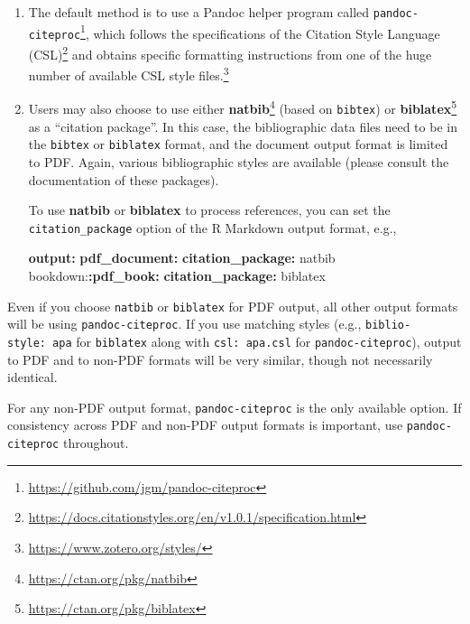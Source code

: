 \documentclass[
  12pt,
]{krantz}
\newenvironment{Shaded}{\begin{snugshade}}{\end{snugshade}}
\newcommand{\AttributeTok}[1]{\textcolor[rgb]{0.13,0.29,0.53}{#1}}
\newcommand{\FunctionTok}[1]{\textcolor[rgb]{0.13,0.29,0.53}{\textbf{#1}}}
\newcommand{\KeywordTok}[1]{\textcolor[rgb]{0.13,0.29,0.53}{\textbf{#1}}}
\renewcommand{\href}[2]{#2\footnote{\url{#1}}}
\theoremstyle{definition}
\theoremstyle{definition}
\theoremstyle{definition}
\theoremstyle{definition}
\theoremstyle{remark}
\begin{document}
\begin{enumerate}
\def\labelenumi{\arabic{enumi}.}
\item
  The default method is to use a Pandoc helper program called \href{https://github.com/jgm/pandoc-citeproc}{\texttt{pandoc-citeproc}}, which follows the specifications of the \href{https://docs.citationstyles.org/en/v1.0.1/specification.html}{Citation Style Language (CSL)} and obtains specific formatting instructions from one of the huge number of available \href{https://www.zotero.org/styles/}{CSL style files.}
\item
  Users may also choose to use either \href{https://ctan.org/pkg/natbib}{\textbf{natbib}} (based on \texttt{bibtex}) or \href{https://ctan.org/pkg/biblatex}{\textbf{biblatex}} as a ``citation package''. In this case, the bibliographic data files need to be in the \texttt{bibtex} or \texttt{biblatex} format, and the document output format is limited to PDF. Again, various bibliographic styles are available (please consult the documentation of these packages).

  To use \textbf{natbib} or \textbf{biblatex} to process references, you can set the \texttt{citation\_package} option of the R Markdown output format, e.g.,

\begin{Shaded}
\begin{Highlighting}[]
\FunctionTok{output}\KeywordTok{:}
\AttributeTok{  }\FunctionTok{pdf\_document}\KeywordTok{:}
\AttributeTok{    }\FunctionTok{citation\_package}\KeywordTok{:}\AttributeTok{ natbib}
\AttributeTok{  bookdown:}\FunctionTok{:pdf\_book}\KeywordTok{:}
\AttributeTok{    }\FunctionTok{citation\_package}\KeywordTok{:}\AttributeTok{ biblatex}
\end{Highlighting}
\end{Shaded}
\end{enumerate}

Even if you choose \texttt{natbib} or \texttt{biblatex} for PDF output, all other output formats will be using \texttt{pandoc-citeproc}. If you use matching styles (e.g., \texttt{biblio-style:\ apa} for \texttt{biblatex} along with \texttt{csl:\ apa.csl} for \texttt{pandoc-citeproc}), output to PDF and to non-PDF formats will be very similar, though not necessarily identical.

For any non-PDF output format, \texttt{pandoc-citeproc} is the only available option. If consistency across PDF and non-PDF output
formats is important, use \texttt{pandoc-citeproc} throughout.
\end{document}
